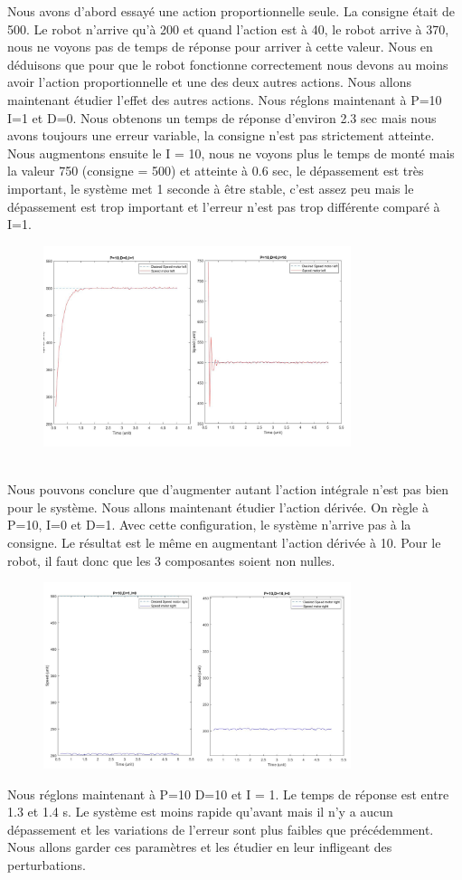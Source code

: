 \documentclass[a4paper]{article}
\begin{document}
		Nous avons d’abord essayé une action proportionnelle seule. La consigne était de 500. Le robot n’arrive qu'à 200 et quand l’action est à 40, le robot arrive à 370, nous ne voyons pas de temps de réponse pour arriver à cette valeur. Nous en déduisons que pour que le robot fonctionne correctement nous devons au moins avoir l’action proportionnelle et une des deux autres actions.
		Nous allons maintenant étudier l’effet des autres actions.
		Nous réglons maintenant à P=10 I=1 et D=0. Nous obtenons un temps de réponse d’environ 2.3 sec mais nous avons toujours une erreur variable, la consigne n’est pas strictement atteinte.
		Nous augmentons ensuite le I = 10, nous ne voyons plus le temps de monté mais la valeur 750 (consigne = 500) et atteinte à 0.6 sec, le dépassement est très important, le système met 1 seconde à être stable, c’est assez peu mais le dépassement est trop important et l’erreur n’est pas trop différente comparé à I=1.
		\begin{figure}[h]
			\centering
			\includegraphics[width = 9cm]{imgs/fig6.png}
			\caption{}
		\end{figure}\\
		Nous pouvons conclure que d’augmenter autant l’action intégrale n’est pas bien pour le système.
		Nous allons maintenant étudier l’action dérivée. On règle à P=10, I=0 et D=1. Avec cette configuration, le système n’arrive pas à la consigne.  Le résultat est le même en augmentant l’action dérivée à 10. Pour le robot, il faut donc que les 3 composantes soient non nulles.
		\newpage
		
		\begin{figure}[h]
			\centering
			\includegraphics[width = 9cm]{imgs/fig7.png}
			\caption{}
		\end{figure}
		Nous réglons maintenant à P=10 D=10 et I = 1. Le temps de réponse est entre 1.3 et 1.4 s. Le système est moins rapide qu’avant mais il n’y a aucun dépassement et les variations de l’erreur sont plus faibles que précédemment. Nous allons garder ces paramètres et les étudier en leur infligeant des perturbations.\\
\end{document}
